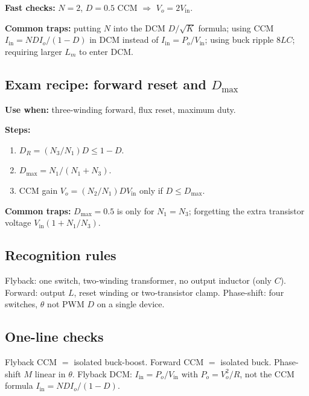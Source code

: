 \textbf{Fast checks:} \(N=2\), \(D=0.5\) CCM \(\Rightarrow\) \(V_o=2 V_{\mathrm{in}}\).

\textbf{Common traps:} putting \(N\) into the DCM \(D/\sqrt{K}\) formula; using CCM \(I_{\mathrm{in}}=ND I_o/(1-D)\) in DCM instead of \(I_{\mathrm{in}}=P_o/V_{\mathrm{in}}\); using buck ripple \(8LC\); requiring larger \(L_m\) to enter DCM.

\subsection{Exam recipe: forward reset and \(D_{\max}\)}
\textbf{Use when:} three-winding forward, flux reset, maximum duty.

\textbf{Steps:}
\begin{enumerate}
  \item \(D_R=(N_3/N_1)D\le 1-D\).
  \item \(D_{\max}=N_1/(N_1+N_3)\).
  \item CCM gain \(V_o=(N_2/N_1) D V_{\mathrm{in}}\) only if \(D\le D_{\max}\).
\end{enumerate}

\textbf{Common traps:} \(D_{\max}=0.5\) is only for \(N_1=N_3\); forgetting the extra transistor voltage \(V_{\mathrm{in}}(1+N_1/N_3)\).

\subsection{Recognition rules}
Flyback: one switch, two-winding transformer, no output inductor (only \(C\)). Forward: output \(L\), reset winding or two-transistor clamp. Phase-shift: four switches, \(\theta\) not PWM \(D\) on a single device.

\subsection{One-line checks}
Flyback CCM \(=\) isolated buck-boost. Forward CCM \(=\) isolated buck. Phase-shift \(M\) linear in \(\theta\). Flyback DCM: \(I_{\mathrm{in}}=P_o/V_{\mathrm{in}}\) with \(P_o=V_o^2/R\), not the CCM formula \(I_{\mathrm{in}}=ND I_o/(1-D)\).
